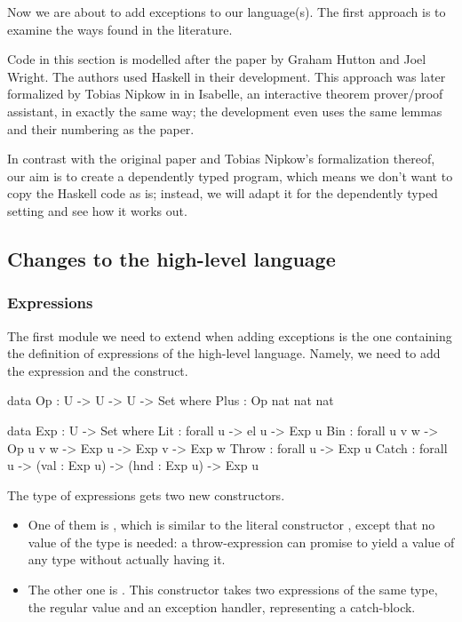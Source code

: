 Now we are about to add exceptions to our language(s). The first approach is to
examine the ways found in the literature.

Code in this section is modelled after the paper \cite{gmh:exceptions} by
Graham Hutton and Joel Wright. The authors used Haskell in their development.
This approach was later formalized by Tobias Nipkow in \cite{nipkow} in
Isabelle, an interactive theorem prover/proof assistant, in exactly the same
way; the development even uses the same lemmas and their numbering as the
paper.

In contrast with the original paper and Tobias Nipkow's formalization thereof,
our aim is to create a dependently typed program, which means we don't want to
copy the Haskell code as is; instead, we will adapt it for the dependently
typed setting and see how it works out.

\subsection{Changes to the high-level language}

\subsubsection{Expressions}

The first module we need to extend when adding exceptions is the one containing
the definition of expressions of the high-level language. Namely, we need to
add the  expression and the  construct.

\begin{code}
  data Op : U -> U -> U -> Set where
    Plus : Op nat nat nat
\end{code}

\begin{code}
  data Exp : U -> Set where
    Lit : forall {u} -> el u -> Exp u
    Bin : forall {u v w} -> Op u v w -> Exp u -> Exp v -> Exp w
    Throw : forall {u} -> Exp u
    Catch : forall {u} -> (val : Exp u) -> (hnd : Exp u) -> Exp u
\end{code}

\noindent The type of expressions gets two new constructors.
\begin{itemize}

  \item One of them is , which is similar to the literal
    constructor , except that no value of the type  is
    needed: a throw-expression can promise to yield a value of any type without
    actually having it.

  \item The other one is . This constructor takes two expressions of
    the same type, the regular value and an exception handler, representing a
    catch-block.

\end{itemize}

